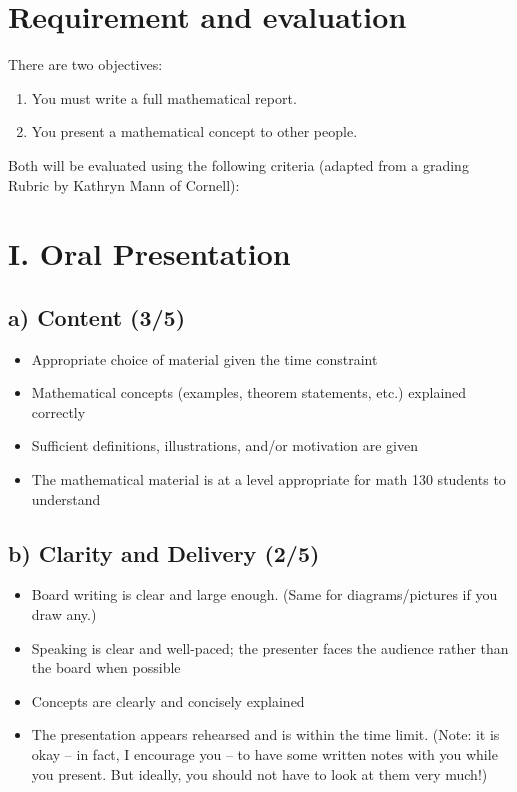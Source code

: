 \documentclass[12pt]{amsart}
\begin{document}
\section{Requirement and evaluation}
There are two objectives:
\begin{enumerate}
    \item You must write a full mathematical report.
    \item You present a mathematical concept to other people.
\end{enumerate}
Both will be evaluated using the following criteria (adapted from a grading Rubric
by Kathryn Mann of Cornell):

\section*{I. Oral Presentation}

\subsection*{a) Content (3/5)}
\begin{itemize}
    \item Appropriate choice of material given the time constraint
    \item Mathematical concepts (examples, theorem statements, etc.) explained correctly
    \item Sufficient definitions, illustrations, and/or motivation are given
    \item The mathematical material is at a level appropriate for math 130 students to understand
\end{itemize}

\subsection*{b) Clarity and Delivery (2/5)}
\begin{itemize}
    \item Board writing is clear and large enough. (Same for diagrams/pictures if you draw any.)
    \item Speaking is clear and well-paced; the presenter faces the audience rather than the board when possible
    \item Concepts are clearly and concisely explained
    \item The presentation appears rehearsed and is within the time limit. (Note: it is okay – in fact, I encourage you – to have some written notes with you while you present. But ideally, you should not have to look at them very much!)
\end{itemize}
\end{document}
